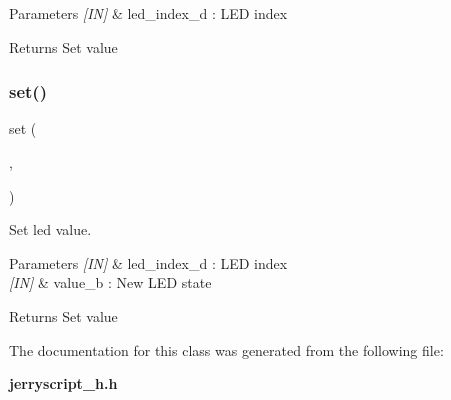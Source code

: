 \begin{DoxyCode}{0}
\end{DoxyCode}



\begin{DoxyParams}{Parameters}
{\em \mbox{[}\+I\+N\mbox{]}} & led\+\_\+index\+\_\+d \+: L\+ED index \\
\hline
\end{DoxyParams}
\begin{DoxyReturn}{Returns}
Set value 
\end{DoxyReturn}
\mbox{\label{classled_ace68f9a6575a6b2c4c4af0ae511fc2ca}} 
\subsubsection{set()}
{\footnotesize\ttfamily set (\begin{DoxyParamCaption}\item[{led\+\_\+index\+\_\+d}]{,  }\item[{value\+\_\+b}]{ }\end{DoxyParamCaption})}



Set led value. 


\begin{DoxyCode}{0}
\end{DoxyCode}



\begin{DoxyParams}{Parameters}
{\em \mbox{[}\+I\+N\mbox{]}} & led\+\_\+index\+\_\+d \+: L\+ED index \\
\hline
{\em \mbox{[}\+I\+N\mbox{]}} & value\+\_\+b \+: New L\+ED state \\
\hline
\end{DoxyParams}
\begin{DoxyReturn}{Returns}
Set value 
\end{DoxyReturn}


The documentation for this class was generated from the following file\+:\begin{DoxyCompactItemize}
\item 
\textbf{ jerryscript\+\_\+h.\+h}\end{DoxyCompactItemize}
